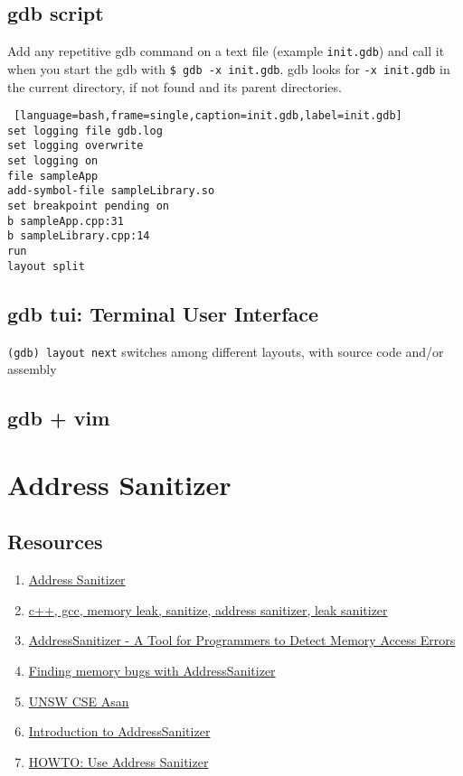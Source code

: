\subsection{gdb script}

Add any repetitive gdb command on a text file (example \texttt{init.gdb}) and call it when you start the gdb with \texttt{\$ gdb -x init.gdb}.
gdb looks for \texttt{-x init.gdb} in the current directory, if not found and its parent directories.

\begin{lstlisting} [language=bash,frame=single,caption=init.gdb,label=init.gdb]
set logging file gdb.log
set logging overwrite
set logging on
file sampleApp
add-symbol-file sampleLibrary.so
set breakpoint pending on
b sampleApp.cpp:31
b sampleLibrary.cpp:14
run
layout split
\end{lstlisting}

\subsection{gdb tui: Terminal User Interface}
\texttt{(gdb) layout next} switches among different layouts, with source code and/or assembly


\subsection{gdb + vim}

\section{Address Sanitizer}%
\label{sec:address_sanitizer}

\subsection{Resources}
\begin{enumerate}
  \item \href{https://clang.llvm.org/docs/AddressSanitizer.html} {Address Sanitizer}
  \item \href{http://gavinchou.github.io/experience/summary/syntax/gcc-address-sanitizer/}{c++, gcc, memory leak, sanitize, address sanitizer, leak sanitizer}
  \item \href{https://www.packetmania.net/en/2022/04/22/ASAN-intro/}{ AddressSanitizer - A Tool for Programmers to Detect Memory Access Errors }
  \item \href{https://embeddedbits.org/finding-memory-bugs-with-addresssanitizer/}{Finding memory bugs with AddressSanitizer}
  \item \href{https://www.cse.unsw.edu.au/~learn/debugging/modules/asan/}{UNSW CSE Asan}
  \item \href{https://www.bynav.com/en/resource/bywork/healthy-work/393.html}{Introduction to AddressSanitizer}
  \item \href{https://www.osc.edu/resources/getting_started/howto/howto_use_address_sanitizer}{HOWTO: Use Address Sanitizer}
\end{enumerate}

